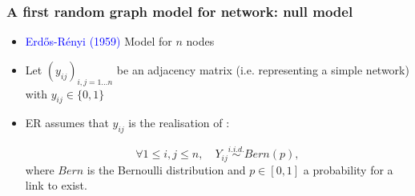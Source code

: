 \documentclass[compress,10pt]{beamer}
\begin{document}





\begin{frame}
\frametitle{A first random graph model for network: null model}

\begin{itemize}
\item  \textcolor{blue}{Erd\H{o}s-Rényi (1959)} Model for $n$ nodes 
\item 

Let $(y_{ij})_{i,j  = 1\dots n}$ be an adjacency matrix (i.e. representing a simple network) with $y_{ij}\in \{0,1\}$ 

\item 
ER assumes that $y_{ij}$ is the realisation of :

$$\forall 1\le i,j\le n,\quad Y_{ij}\overset{i.i.d.}{\sim} Bern(p),$$
where $Bern$ is the Bernoulli distribution and $p\in[0,1]$ a probability for a link to exist. 
\end{itemize}
\end{frame}
\end{document}
